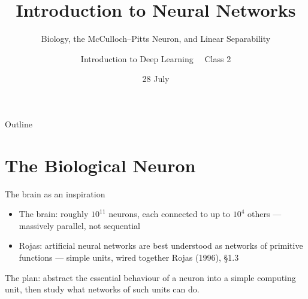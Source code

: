 \documentclass[aspectratio=169, 11pt]{beamer}
\title{Introduction to Neural Networks}
\subtitle{Biology, the McCulloch--Pitts Neuron, and Linear Separability}
\author{Introduction to Deep Learning \ \textperiodcentered\ Class 2}
\institute{}
\date{28 July}
\newcommand{\src}[3]{}      %
\newcommand{\nosrc}{}       %
\begin{document}
\maketitle

\begin{frame}{Outline}
  \nosrc
  \tableofcontents
\end{frame}

\section{The Biological Neuron}

\begin{frame}{The brain as an inspiration}
  \src{rojas1996}{section}{1.3.1}
  \src{rojas1996}{section}{1.1.1}
  \begin{itemize}
    \item The brain: roughly $10^{11}$ neurons, each connected
          to up to $10^{4}$ others --- massively
          \alert{parallel}, not sequential
    \item Rojas: artificial neural networks are best understood
          as \alert{networks of primitive functions} ---
          simple units, wired together
          \hfill{\scriptsize Rojas (1996), \S1.3}
  \end{itemize}
  \vspace{0.4em}
  \begin{redhighlight}
    The plan: abstract the essential behaviour of a neuron
    into a simple computing unit, then study what networks of
    such units can do.
  \end{redhighlight}
\end{frame}
\end{document}
